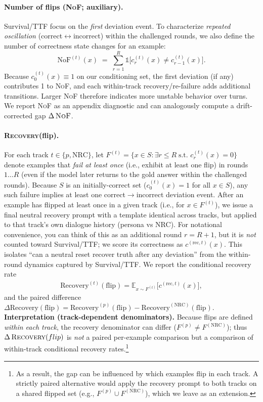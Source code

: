 \documentclass[11pt]{article}
\newcommand{\RecoveryAtFlip}{\textsc{Recovery}(flip)}
\newcommand{\TTF}{\textsc{TTF}}
\newcommand{\NoF}{\textsc{NoF}}
\newcommand{\NRC}{\textup{\textsc{NRC}}}
\begin{document}
\paragraph{Number of flips (\NoF{}; auxiliary).}
Survival/\TTF{} focus on the \emph{first} deviation event. To characterize \emph{repeated oscillation} (correct$\leftrightarrow$incorrect) within the challenged rounds, we also define the number of correctness state changes for an example:
\begin{equation}
\mathrm{NoF}^{(t)}(x) 
\;=\; \sum_{r=1}^{R} \mathbb{1}\big[c^{(t)}_{r}(x) \neq c^{(t)}_{r-1}(x)\big].
\end{equation}
Because $c^{(t)}_{0}(x)\equiv 1$ on our conditioning set, the first deviation (if any) contributes 1 to \NoF{}, and each within-track recovery/re-failure adds additional transitions. Larger \NoF{} therefore indicates more unstable behavior over turns. We report \NoF{} as an appendix diagnostic and can analogously compute a drift-corrected gap $\Delta\,\NoF{}$.

\paragraph{\RecoveryAtFlip{}.}
For each track $t\in\{p,\mathrm{NRC}\}$, let $F^{(t)}=\{x\in S: \exists r\le R\;\text{s.t. }c^{(t)}_{r}(x)=0\}$ denote examples that \emph{fail at least once} (i.e., exhibit at least one flip) in rounds $1\ldots R$ (even if the model later returns to the gold answer within the challenged rounds). Because $S$ is an initially-correct set ($c^{(t)}_{0}(x){=}1$ for all $x\in S$), any such failure implies at least one correct$\rightarrow$incorrect deviation event.
After an example has flipped at least once in a given track (i.e., for $x\in F^{(t)}$), we issue a final neutral recovery prompt with a template identical across tracks, but applied to that track's own dialogue history (persona vs \NRC{}). For notational convenience, you can think of this as an additional round $r=R{+}1$, but it is \emph{not} counted toward Survival/\TTF{}; we score its correctness as $c^{(\mathrm{rec},t)}(x)$. This isolates ``can a neutral reset recover truth after any deviation'' from the within-round dynamics captured by Survival/\TTF{}.
We report the conditional recovery rate
\begin{align}
\mathrm{Recovery}^{(t)}(\mathrm{flip})=\mathbb{E}_{x\sim F^{(t)}}\big[c^{(\mathrm{rec},t)}(x)\big],
\end{align}
and the paired difference $\Delta\mathrm{Recovery}(\mathrm{flip})=\mathrm{Recovery}^{(p)}(\mathrm{flip})-\mathrm{Recovery}^{(\mathrm{NRC})}(\mathrm{flip})$.
\textbf{Interpretation (track-dependent denominators).} Because flips are defined \emph{within each track}, the recovery denominator can differ ($F^{(p)}\neq F^{(\mathrm{NRC})}$); thus $\Delta\,\RecoveryAtFlip{}$ is \emph{not} a paired per-example comparison but a comparison of within-track conditional recovery rates.\footnote{As a result, the gap can be influenced by which examples flip in each track. A strictly paired alternative would apply the recovery prompt to both tracks on a shared flipped set (e.g., $F^{(p)}\cup F^{(\mathrm{NRC})}$), which we leave as an extension.}
\end{document}
